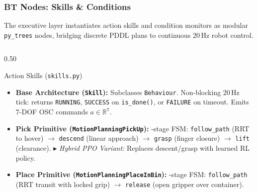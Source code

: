\documentclass[10pt]{beamer}
\begin{document}
\begin{frame}[t]
\frametitle{BT Nodes: Skills \& Conditions}
\footnotesize
The executive layer instantiates action skills and condition monitors as modular \texttt{py\_trees} nodes, bridging discrete PDDL plans to continuous 20\,Hz robot control.

\vspace{0.04cm}
\begin{columns}[T]
    \begin{column}{0.50\textwidth}
        \begin{block}{Action Skills (\texttt{skills.py})}
            \begin{itemize}\scriptsize
                \setlength\itemsep{0.12em}
                \item \textbf{Base Architecture (\texttt{Skill}):}
                \newline Subclasses \texttt{Behaviour}. Non-blocking 20\,Hz tick: returns \texttt{RUNNING}, \texttt{SUCCESS} on \texttt{is\_done()}, or \texttt{FAILURE} on timeout. Emits 7-DOF OSC commands $a \in \mathbb{R}^7$.
                \item \textbf{Pick Primitive (\texttt{MotionPlanningPickUp}):}
                -stage FSM: \texttt{follow\_path} (RRT to hover) $\to$ \texttt{descend} (linear approach) $\to$ \texttt{grasp} (finger closure) $\to$ \texttt{lift} (clearance).
                \newline $\blacktriangleright$ \textit{Hybrid PPO Variant:} Replaces descent/grasp with learned RL policy.
                \item \textbf{Place Primitive (\texttt{MotionPlanningPlaceInBin}):}
                -stage FSM: \texttt{follow\_path} (RRT transit with locked grip) $\to$ \texttt{release} (open gripper over container).
            \end{itemize}
        \end{block}
    \end{column}


\end{columns}
\end{frame}
\end{document}
